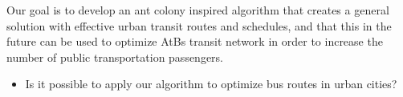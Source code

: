 Our goal is to develop an ant colony inspired algorithm that creates a general solution with effective urban transit routes and schedules, and that this in the future can be used to optimize AtBs transit network in order to increase the number of public transportation passengers. 
\begin{itemize}
\item Is it possible to apply our algorithm to optimize bus routes in urban cities?
\end{itemize}
